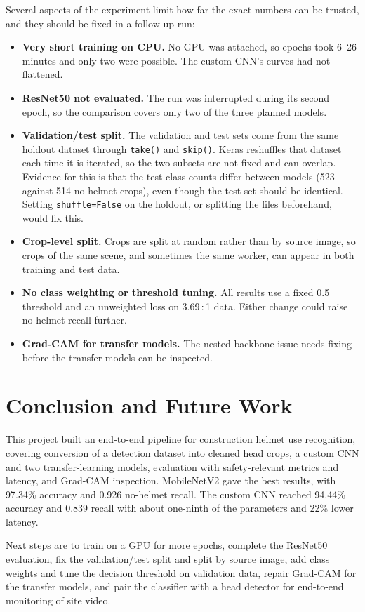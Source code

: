 \documentclass[conference]{IEEEtran}
\begin{document}
Several aspects of the experiment limit how far the exact numbers can be trusted, and they should be fixed in a follow-up run:
\begin{itemize}
  \item \textbf{Very short training on CPU.} No GPU was attached, so epochs took 6--26 minutes and only two were possible. The custom CNN's curves had not flattened.
  \item \textbf{ResNet50 not evaluated.} The run was interrupted during its second epoch, so the comparison covers only two of the three planned models.
  \item \textbf{Validation/test split.} The validation and test sets come from the same holdout dataset through \texttt{take()} and \texttt{skip()}. Keras reshuffles that dataset each time it is iterated, so the two subsets are not fixed and can overlap. Evidence for this is that the test class counts differ between models (523 against 514 no-helmet crops), even though the test set should be identical. Setting \texttt{shuffle=False} on the holdout, or splitting the files beforehand, would fix this.
  \item \textbf{Crop-level split.} Crops are split at random rather than by source image, so crops of the same scene, and sometimes the same worker, can appear in both training and test data.
  \item \textbf{No class weighting or threshold tuning.} All results use a fixed 0.5 threshold and an unweighted loss on 3.69\,:\,1 data. Either change could raise no-helmet recall further.
  \item \textbf{Grad-CAM for transfer models.} The nested-backbone issue needs fixing before the transfer models can be inspected.
\end{itemize}

\section{Conclusion and Future Work}
This project built an end-to-end pipeline for construction helmet use recognition, covering conversion of a detection dataset into cleaned head crops, a custom CNN and two transfer-learning models, evaluation with safety-relevant metrics and latency, and Grad-CAM inspection. MobileNetV2 gave the best results, with 97.34\% accuracy and 0.926 no-helmet recall. The custom CNN reached 94.44\% accuracy and 0.839 recall with about one-ninth of the parameters and 22\% lower latency.

Next steps are to train on a GPU for more epochs, complete the ResNet50 evaluation, fix the validation/test split and split by source image, add class weights and tune the decision threshold on validation data, repair Grad-CAM for the transfer models, and pair the classifier with a head detector for end-to-end monitoring of site video.



\end{document}
